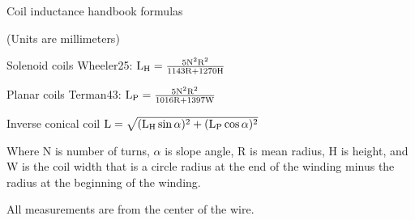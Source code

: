 \documentclass[fleqn]{article}
\begin{document}
	\begin{center}

		{\LARGE Coil inductance handbook formulas} \smallbreak

		{\tiny (Units are millimeters)} \bigbreak

		Solenoid coils \smallbreak
		Wheeler25: \enspace $\rm L_H = \frac{5N^2 R^2}{1143R + 1270H}$ \bigbreak

		Planar coils \smallbreak
		Terman43: \enspace  $\rm L_P = \frac{5N^2 R^2}{1016R + 1397W}$ \bigbreak

		Inverse conical coil \smallbreak
		$\rm{L = \sqrt{(L_H \sin\alpha)^2 + (L_P \cos\alpha)^2}}$ \bigbreak

	\end{center}

	Where N is number of turns,  $\alpha$ is slope angle, R is mean radius,
	H is height, and W is the coil width that is a circle radius at the end
	of the winding minus the radius at the beginning of the winding. \medbreak

	All measurements are from the center of the wire.
\end{document}
